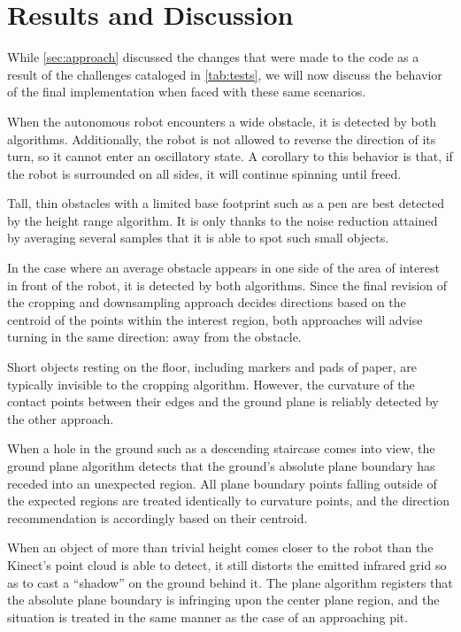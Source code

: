 \documentclass[12pt]{report}
\begin{document}
\section{Results and Discussion}
While \autoref{sec:approach} discussed the changes that were made to the code as a result of the challenges cataloged in \autoref{tab:tests}, we will now discuss the behavior of the final implementation when faced with these same scenarios.

When the autonomous robot encounters a wide obstacle, it is detected by both algorithms.  Additionally, the robot is not allowed to reverse the direction of its turn, so it cannot enter an oscillatory state.  A corollary to this behavior is that, if the robot is surrounded on all sides, it will continue spinning until freed.

Tall, thin obstacles with a limited base footprint such as a pen are best detected by the height range algorithm.  It is only thanks to the noise reduction attained by averaging several samples that it is able to spot such small objects.

In the case where an average obstacle appears in one side of the area of interest in front of the robot, it is detected by both algorithms.  Since the final revision of the cropping and downsampling approach decides directions based on the centroid of the points within the interest region, both approaches will advise turning in the same direction: away from the obstacle.

Short objects resting on the floor, including markers and pads of paper, are typically invisible to the cropping algorithm.  However, the curvature of the contact points between their edges and the ground plane is reliably detected by the other approach.

When a hole in the ground such as a descending staircase comes into view, the ground plane algorithm detects that the ground's absolute plane boundary has receded into an unexpected region.  All plane boundary points falling outside of the expected regions are treated identically to curvature points, and the direction recommendation is accordingly based on their centroid.

When an object of more than trivial height comes closer to the robot than the Kinect's point cloud is able to detect, it still distorts the emitted infrared grid so as to cast a ``shadow'' on the ground behind it.  The plane algorithm registers that the absolute plane boundary is infringing upon the center plane region, and the situation is treated in the same manner as the case of an approaching pit.
\end{document}
